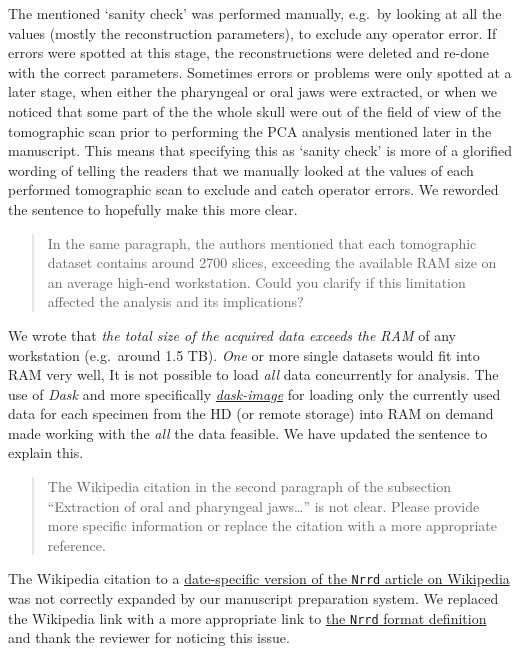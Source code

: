 \documentclass[color,english,personal]{ubletter}
\begin{document}
\begin{letter}{}
The mentioned `sanity check' was performed manually, e.g.~by looking at
all the values (mostly the reconstruction parameters), to exclude any
operator error. If errors were spotted at this stage, the
reconstructions were deleted and re-done with the correct parameters.
Sometimes errors or problems were only spotted at a later stage, when
either the pharyngeal or oral jaws were extracted, or when we noticed
that some part of the the whole skull were out of the field of view of
the tomographic scan prior to performing the PCA analysis mentioned
later in the manuscript. This means that specifying this as `sanity
check' is more of a glorified wording of telling the readers that we
manually looked at the values of each performed tomographic scan to
exclude and catch operator errors. We reworded the sentence to hopefully
make this more clear.

\begin{quote}
In the same paragraph, the authors mentioned that each tomographic
dataset contains around 2700 slices, exceeding the available RAM size on
an average high-end workstation. Could you clarify if this limitation
affected the analysis and its implications?
\end{quote}

We wrote that \emph{the total size of the acquired data exceeds the RAM}
of any workstation (e.g.~around 1.5 TB). \emph{One} or more single
datasets would fit into RAM very well, It is not possible to load
\emph{all} data concurrently for analysis. The use of \emph{Dask} and
more specifically \href{@https://image.dask.org/}{\emph{dask-image}} for
loading only the currently used data for each specimen from the HD (or
remote storage) into RAM on demand made working with the \emph{all} the
data feasible. We have updated the sentence to explain this.

\begin{quote}
The Wikipedia citation in the second paragraph of the subsection
``Extraction of oral and pharyngeal jaws\ldots{}'' is not clear. Please
provide more specific information or replace the citation with a more
appropriate reference.
\end{quote}

The Wikipedia citation to a \href{https://w.wiki/5mBK}{date-specific
version of the \texttt{Nrrd} article on Wikipedia} was not correctly
expanded by our manuscript preparation system. We replaced the Wikipedia
link with a more appropriate link to
\href{https://teem.sourceforge.net/nrrd/format.html}{the \texttt{Nrrd}
format definition} and thank the reviewer for noticing this issue.


\end{letter}
\end{document}
